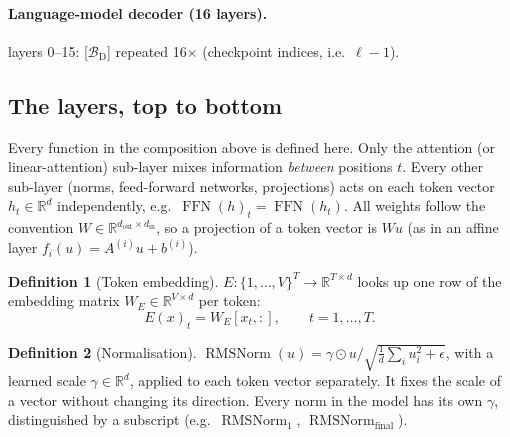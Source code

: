 \documentclass[10pt,a4paper]{article}
\newcommand{\op}[1]{\operatorname{#1}}
\theoremstyle{definition}
\newtheorem{definition}{Definition}[section]
\begin{document}
\paragraph{Language-model decoder (16 layers).} 
layers 0--15: [$\mathcal{B}_{\mathrm{D}}$] repeated 16$\times$ (checkpoint indices, i.e.\ $\ell-1$).
\subsection{The layers, top to bottom}\label{sec:layers}
Every function in the composition above is defined here. Only the attention (or linear-attention) sub-layer mixes information \emph{between} positions $t$. Every other sub-layer (norms, feed-forward networks, projections) acts on each token vector $h_t\in\mathbb{R}^{d}$ independently, e.g.\ $\op{FFN}(h)_t=\op{FFN}(h_t)$. All weights follow the convention $W\in\mathbb{R}^{d_{\mathrm{out}}\times d_{\mathrm{in}}}$, so a projection of a token vector is $W u$ (as in an affine layer $f_i(u)=A^{(i)}u+b^{(i)}$).
\begin{definition}[Token embedding]\label{def:embed}
$E:\{1,\dots,V\}^{T}\to\mathbb{R}^{T\times d}$ looks up one row of the embedding matrix $W_E\in\mathbb{R}^{V\times d}$ per token:
\begin{equation}
  E(x)_t = W_E[x_t,:],\qquad t=1,\dots,T.
\end{equation}
\end{definition}
\begin{definition}[Normalisation]
$\op{RMSNorm}(u)=\gamma\odot u/\sqrt{\tfrac1d\sum_i u_i^2+\epsilon}$, with a learned scale $\gamma\in\mathbb{R}^{d}$, applied to each token vector separately. It fixes the scale of a vector without changing its direction. Every norm in the model has its own $\gamma$, distinguished by a subscript (e.g.\ $\op{RMSNorm}_1$, $\op{RMSNorm}_{\mathrm{final}}$).
\end{definition}
\end{document}
